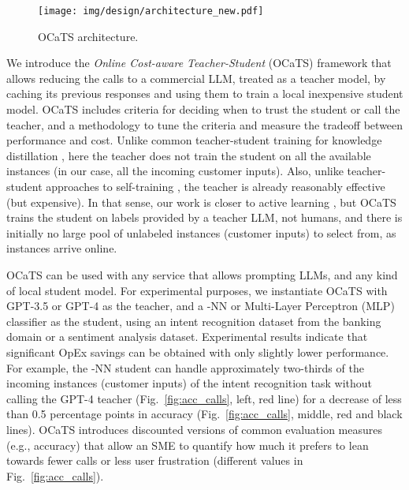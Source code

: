\documentclass[11pt]{article}
\begin{document}
\begin{figure}[!tbp]
    \centering
    \texttt{[image: img/design/architecture\_new.pdf]}
    \caption{OCaTS architecture.}
    \label{fig:architecture}
    \vspace*{-4mm}
\end{figure}

We introduce the \emph{Online Cost-aware Teacher-Student} (OCaTS) framework that allows reducing the calls to a commercial LLM, treated as a teacher model, by caching its previous responses and using them to train a local inexpensive student model. OCaTS includes criteria for deciding when to trust the student or call the teacher, and a methodology to tune the criteria and measure the tradeoff between performance and cost. Unlike common teacher-student training for knowledge distillation \cite{DistillationHinton,10.1007/s11263-021-01453-z}, here the teacher does not train the student on all the available instances (in our case, all the incoming customer inputs). Also, unlike teacher-student approaches to self-training \cite{SelfTrainingForDialogues,SelfTrainingAndPreTrainingComplementary}, the teacher is already reasonably effective (but expensive). In that sense, our work is closer to active learning \cite{ActiveLearningBook,HumanInTheLoopBook}, but OCaTS trains the student on labels provided by a teacher LLM, not humans, and there is initially no large pool of unlabeled instances (customer inputs) to select from, as instances arrive online. 

OCaTS can be used with any service that allows prompting LLMs, and any kind of local student model. For experimental purposes, we instantiate OCaTS with GPT-3.5 or GPT-4 as the teacher, and a -NN or Multi-Layer Perceptron (MLP) classifier as the student, using an intent recognition dataset from the banking domain or a sentiment analysis dataset. Experimental results indicate that significant OpEx savings can be obtained with only slightly lower performance. For example, the -NN student can handle approximately two-thirds of the incoming instances (customer inputs) of the intent recognition task without calling the GPT-4 teacher (Fig.~\ref{fig:acc_calls}, left, red line) for a decrease of less than 0.5 percentage points in accuracy (Fig.~\ref{fig:acc_calls}, middle, red and black lines). OCaTS introduces discounted versions of common evaluation measures (e.g., accuracy) that allow an SME to quantify how much it prefers to lean towards fewer calls or less user frustration (different  values in Fig.~\ref{fig:acc_calls}).
\end{document}
